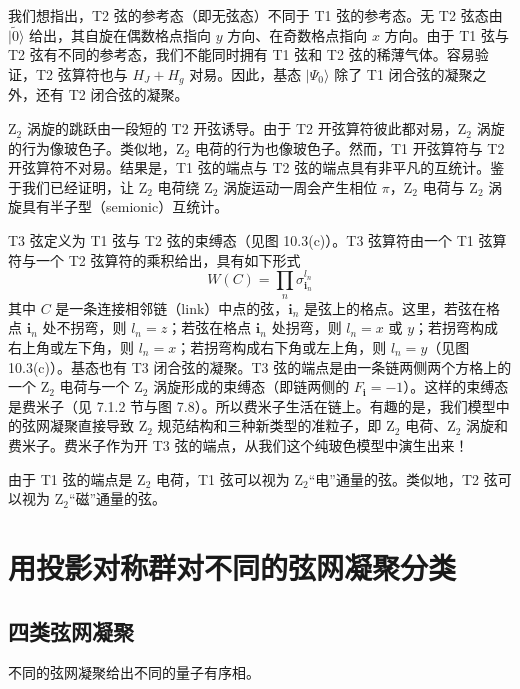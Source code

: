 我们想指出，T2 弦的参考态（即无弦态）不同于 T1 弦的参考态。无 T2 弦态由 $|\tilde{0}\rangle$ 给出，其自旋在偶数格点指向 $y$ 方向、在奇数格点指向 $x$ 方向。由于 T1 弦与 T2 弦有不同的参考态，我们不能同时拥有 T1 弦和 T2 弦的稀薄气体。容易验证，T2 弦算符也与 $H_J+H_g$ 对易。因此，基态 $|\Psi_0\rangle$ 除了 T1 闭合弦的凝聚之外，还有 T2 闭合弦的凝聚。


Z$_2$ 涡旋的跳跃由一段短的 T2 开弦诱导。由于 T2 开弦算符彼此都对易，Z$_2$ 涡旋的行为像玻色子。类似地，Z$_2$ 电荷的行为也像玻色子。然而，T1 开弦算符与 T2 开弦算符不对易。结果是，T1 弦的端点与 T2 弦的端点具有非平凡的互统计。鉴于我们已经证明，让 Z$_2$ 电荷绕 Z$_2$ 涡旋运动一周会产生相位 $\pi$，Z$_2$ 电荷与 Z$_2$ 涡旋具有半子型（semionic）互统计。

T3 弦定义为 T1 弦与 T2 弦的束缚态（见图 10.3(c)）。T3 弦算符由一个 T1 弦算符与一个 T2 弦算符的乘积给出，具有如下形式
\begin{equation*}
W(C)=\prod_n\sigma_{\pmb{i}_n}^{l_n}
\end{equation*}
其中 $C$ 是一条连接相邻链（link）中点的弦，$\pmb{i}_n$ 是弦上的格点。这里，若弦在格点 $\pmb{i}_n$ 处不拐弯，则 $l_n=z$；若弦在格点 $\pmb{i}_n$ 处拐弯，则 $l_n=x$ 或 $y$；若拐弯构成右上角或左下角，则 $l_n=x$；若拐弯构成右下角或左上角，则 $l_n=y$（见图 10.3(c)）。基态也有 T3 闭合弦的凝聚。T3 弦的端点是由一条链两侧两个方格上的一个 Z$_2$ 电荷与一个 Z$_2$ 涡旋形成的束缚态（即链两侧的 $F_{\pmb{i}}=-1$）。这样的束缚态是费米子（见 7.1.2 节与图 7.8）。所以费米子生活在链上。有趣的是，我们模型中的弦网凝聚直接导致 Z$_2$ 规范结构和三种新类型的准粒子，即 Z$_2$ 电荷、Z$_2$ 涡旋和费米子。费米子作为开 T3 弦的端点，从我们这个纯玻色模型中演生出来！

由于 T1 弦的端点是 Z$_2$ 电荷，T1 弦可以视为 Z$_2$“电”通量的弦。类似地，T2 弦可以视为 Z$_2$“磁”通量的弦。

\section{用投影对称群对不同的弦网凝聚分类}

\subsection{四类弦网凝聚}

\begin{keypoints}\item 不同的弦网凝聚给出不同的量子有序相。\end{keypoints}

